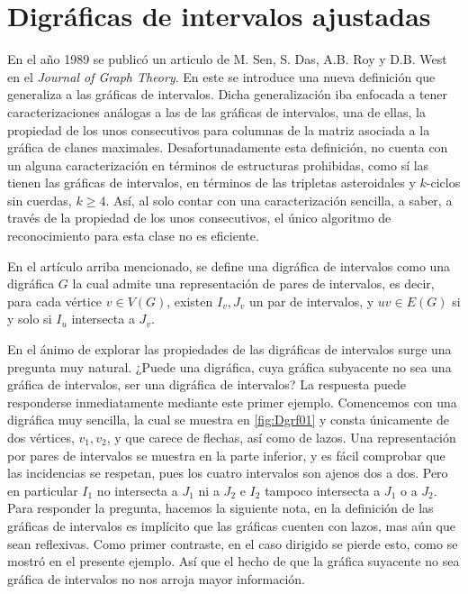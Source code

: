 \chapter{Digráficas de intervalos ajustadas}
\label{cap:DigrafIntAj}

En el año 1989 se publicó un articulo de M. Sen, S. Das, A.B. Roy y D.B. West en el  \textit{Journal of Graph Theory}. En este se introduce una nueva definición que generaliza a las gráficas de intervalos. Dicha generalización iba enfocada a tener caracterizaciones análogas a las de las gráficas de intervalos, una de ellas, la propiedad de los unos consecutivos para columnas de la matriz asociada a la gráfica de clanes maximales. 
Desafortunadamente esta definición, no cuenta con un alguna caracterización en términos de estructuras prohibidas, como sí las tienen las gráficas de intervalos, en términos de las tripletas asteroidales y $k$-ciclos sin cuerdas, $k \geq 4$. Así, al solo contar con una caracterización sencilla, a saber, a través de la propiedad de los unos consecutivos, el único algoritmo de reconocimiento para esta clase no es eficiente.

En el artículo arriba mencionado, se define una digráfica de intervalos como una digráfica $G$ la cual admite una representación de pares de intervalos, es decir, para cada vértice $v \in V(G)$, existen $I_v,J_v$ un par de intervalos, y $uv\in E(G)$ si y solo si $I_u$ intersecta a $J_v$. 

En el ánimo de explorar las propiedades de las digráficas de intervalos surge una pregunta muy natural. ¿Puede una digráfica, cuya gráfica subyacente no sea una gráfica de intervalos, ser una digráfica de intervalos? La respuesta puede responderse inmediatamente mediante este primer ejemplo. Comencemos con una digráfica muy sencilla, la cual se muestra en \cref{fig:Dgrf01} y consta únicamente de dos vértices, $v_1, v_2$, y que carece de flechas, así como de lazos. Una representación por pares de intervalos se muestra en la parte inferior, y es fácil comprobar que las incidencias se respetan, pues los cuatro intervalos son ajenos dos a dos. Pero en particular $I_1$ no intersecta a $J_1$ ni a $J_2$ e $I_2$ tampoco intersecta a $J_1$ o a $J_2$. Para responder la pregunta, hacemos la siguiente nota, en la definición de las gráficas de intervalos es implícito que las gráficas cuenten con lazos, mas aún que sean reflexivas. Como primer contraste, en el caso dirigido se pierde esto, como se mostró en el presente ejemplo. Así que el hecho de que la gráfica suyacente no sea gráfica de intervalos no nos arroja mayor información. 

